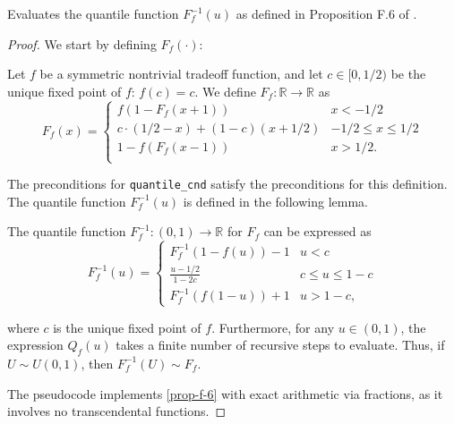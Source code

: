 \documentclass{article}
\begin{document}
\begin{theorem}
    \label{postcondition}
    Evaluates the quantile function $F^{-1}_f(u)$
    as defined in Proposition F.6 of \cite{awan2023canonical}.
\end{theorem}

\begin{proof} 

We start by defining $F_f(\cdot)$:
\begin{definition}
    \label{def1}  %
    Let $f$ be a symmetric nontrivial tradeoff function, and let {$c\in [0,1/2)$} be the unique fixed point of $f$: $f(c)=c$. 
    We define $F_f:\mathbb{R}\rightarrow \mathbb{R}$ as
    \begin{equation}
        F_f(x) = \begin{cases}
            f(1-F_f(x+1))&x<-1/2\\
            c \cdot (1/2-x) + (1-c)(x+1/2)&-1/2\leq x\leq 1/2\\
            1-f(F_f(x-1))&x>1/2.\\
        \end{cases}
    \end{equation}
\end{definition}

The preconditions for \texttt{quantile\_cnd} satisfy the preconditions for this definition.
The quantile function $F^{-1}_f(u)$ is defined in the following lemma.
\begin{proposition}
    \label{prop-f-6}
    The quantile function $F_f^{-1}:(0,1)\rightarrow \mathbb{R}$ for $F_f$ can be expressed as
    \begin{equation}
        F_f^{-1}(u) = \begin{cases}
            F_f^{-1}(1-f(u))-1&u<c\\
            \frac{u-1/2}{1-2c}&c\leq u\leq 1-c\\
            F_f^{-1}(f(1-u))+1&u>1-c,
        \end{cases}
    \end{equation}
    
    where $c$ is the unique fixed point of $f$. 
    {Furthermore, for any $u\in (0,1)$, the expression $Q_f(u)$ takes a finite number of recursive steps to evaluate. Thus,} 
    if $U\sim U(0,1)$, then $F_f^{-1}(U) \sim F_f$. 
\end{proposition}

The pseudocode implements \ref{prop-f-6} with exact arithmetic via fractions,
as it involves no transcendental functions.

\end{proof}

\printbibliography
\end{document}
